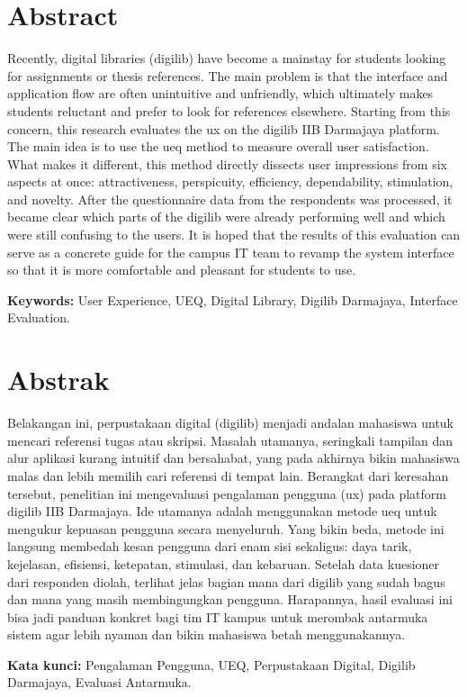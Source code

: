 \chapter*{Abstract}
Recently, digital libraries (\gls{digilib}) have become a mainstay for students looking for assignments or thesis references. The main problem is that the interface and application flow are often unintuitive and unfriendly, which ultimately makes students reluctant and prefer to look for references elsewhere. Starting from this concern, this research evaluates the \gls{ux} on the \gls{digilib} IIB Darmajaya platform. The main idea is to use the \gls{ueq} method to measure overall user satisfaction. What makes it different, this method directly dissects user impressions from six aspects at once: attractiveness, perspicuity, efficiency, dependability, stimulation, and novelty. After the questionnaire data from the respondents was processed, it became clear which parts of the \gls{digilib} were already performing well and which were still confusing to the users. It is hoped that the results of this evaluation can serve as a concrete guide for the campus IT team to revamp the system interface so that it is more comfortable and pleasant for students to use.

\noindent\textbf{Keywords:} User Experience, UEQ, Digital Library, Digilib Darmajaya, Interface Evaluation.

\chapter*{Abstrak}
Belakangan ini, perpustakaan digital (\gls{digilib}) menjadi andalan mahasiswa untuk mencari referensi tugas atau skripsi. Masalah utamanya, seringkali tampilan dan alur aplikasi kurang intuitif dan bersahabat, yang pada akhirnya bikin mahasiswa malas dan lebih memilih cari referensi di tempat lain. Berangkat dari keresahan tersebut, penelitian ini mengevaluasi pengalaman pengguna (\gls{ux}) pada platform \gls{digilib} IIB Darmajaya. Ide utamanya adalah menggunakan metode \gls{ueq} untuk mengukur kepuasan pengguna secara menyeluruh. Yang bikin beda, metode ini langsung membedah kesan pengguna dari enam sisi sekaligus: daya tarik, kejelasan, efisiensi, ketepatan, stimulasi, dan kebaruan. Setelah data kuesioner dari responden diolah, terlihat jelas bagian mana dari \gls{digilib} yang sudah bagus dan mana yang masih membingungkan pengguna. Harapannya, hasil evaluasi ini bisa jadi panduan konkret bagi tim IT kampus untuk merombak antarmuka sistem agar lebih nyaman dan bikin mahasiswa betah menggunakannya.

\noindent\textbf{Kata kunci:} Pengalaman Pengguna, UEQ, Perpustakaan Digital, Digilib Darmajaya, Evaluasi Antarmuka.
